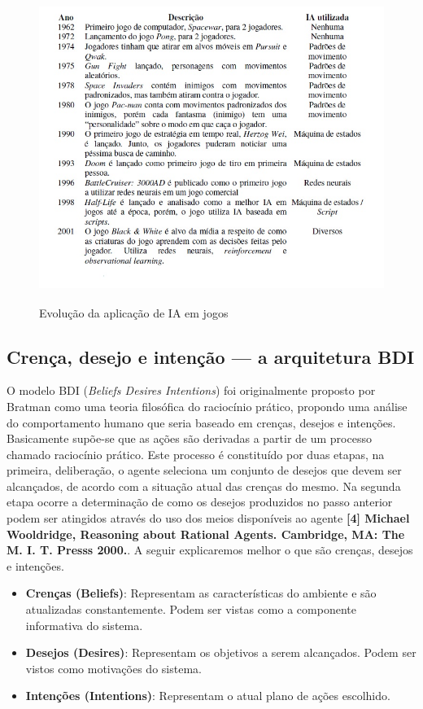 \begin{figure}
\centering
\includegraphics [height=10cm]{figuras/evolucao_IA_jogos.jpg}
\caption{Evolução da aplicação de IA em jogos}
\label{IA em jogos}
\end{figure}




\subsection{Crença, desejo e intenção --- a arquitetura BDI}

O modelo BDI (\textit{Beliefs Desires Intentions}) foi originalmente proposto por Bratman como uma teoria filosófica do raciocínio prático, propondo uma análise do comportamento humano que seria baseado em crenças, desejos e intenções.
Basicamente supõe-se que as ações são derivadas a partir de um processo chamado raciocínio prático. Este processo é constituído por duas etapas, na primeira, deliberação, o agente seleciona um conjunto de desejos que devem ser alcançados, de acordo com a situação atual das crenças do mesmo. Na segunda etapa ocorre a determinação de como os desejos produzidos no passo anterior podem ser atingidos através do uso dos meios disponíveis ao agente \textbf{[4] Michael Wooldridge, Reasoning about Rational Agents. Cambridge, MA: The M. I. T. Presss 2000.}.
A seguir explicaremos melhor o que são crenças, desejos e intenções.
\begin{itemize}
\item \textbf{Crenças (Beliefs)}: Representam as características do ambiente e são atualizadas constantemente. Podem ser vistas como a componente informativa do sistema.
\item \textbf{Desejos (Desires)}: Representam os objetivos a serem alcançados. Podem ser vistos como motivações do sistema.
\item \textbf{Intenções (Intentions)}: Representam o atual plano de ações escolhido. 
\end{itemize}

